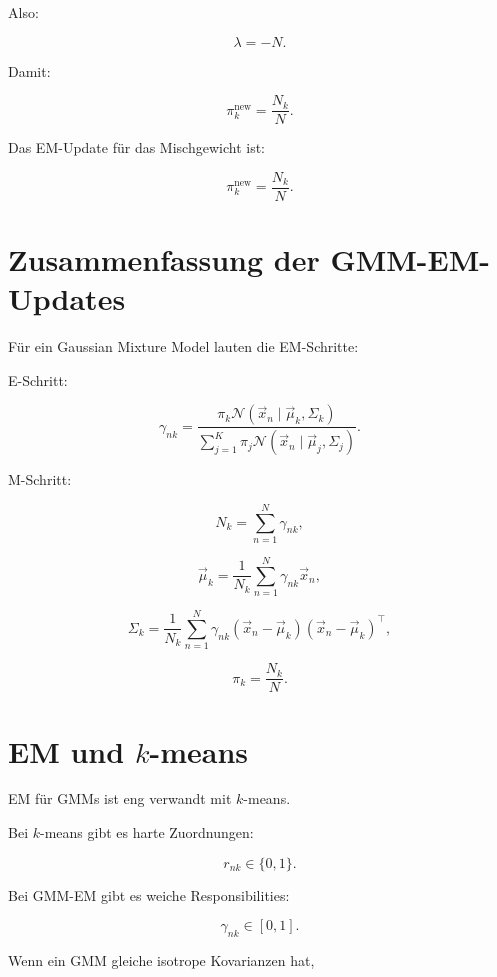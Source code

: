 Also:

\[
    \lambda=-N.
\]

Damit:

\[
    \pi_k^{\mathrm{new}}
    =
    \frac{N_k}{N}.
\]

\begin{definitionbox}
Das EM-Update für das Mischgewicht ist:

\[
    \pi_k^{\mathrm{new}}
    =
    \frac{N_k}{N}.
\]
\end{definitionbox}

\section{Zusammenfassung der GMM-EM-Updates}

\begin{conceptbox}
Für ein Gaussian Mixture Model lauten die EM-Schritte:

E-Schritt:

\[
    \gamma_{nk}
    =
    \frac{
        \pi_k
        \mathcal{N}(\vec{x}_n\mid\vec{\mu}_k,\Sigma_k)
    }{
        \sum_{j=1}^{K}
        \pi_j
        \mathcal{N}(\vec{x}_n\mid\vec{\mu}_j,\Sigma_j)
    }.
\]

M-Schritt:

\[
    N_k
    =
    \sum_{n=1}^{N}
    \gamma_{nk},
\]

\[
    \vec{\mu}_k
    =
    \frac{1}{N_k}
    \sum_{n=1}^{N}
    \gamma_{nk}
    \vec{x}_n,
\]

\[
    \Sigma_k
    =
    \frac{1}{N_k}
    \sum_{n=1}^{N}
    \gamma_{nk}
    (\vec{x}_n-\vec{\mu}_k)
    (\vec{x}_n-\vec{\mu}_k)^{\top},
\]

\[
    \pi_k
    =
    \frac{N_k}{N}.
\]
\end{conceptbox}

\section{EM und \(k\)-means}

EM für GMMs ist eng verwandt mit \(k\)-means.

Bei \(k\)-means gibt es harte Zuordnungen:

\[
    r_{nk}
    \in
    \{0,1\}.
\]

Bei GMM-EM gibt es weiche Responsibilities:

\[
    \gamma_{nk}
    \in
    [0,1].
\]

Wenn ein GMM gleiche isotrope Kovarianzen hat,


